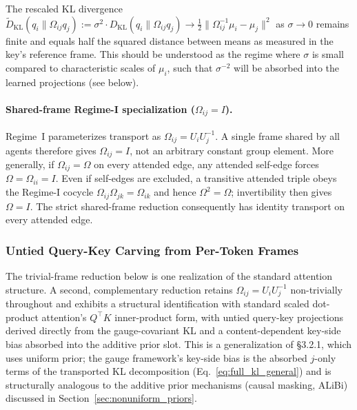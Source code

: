 \documentclass[twoside,11pt]{article}
\begin{document}
The rescaled KL divergence $\widetilde{D}_{\mathrm{KL}}(q_i \| \Omega_{ij}q_j) := \sigma^2 \cdot D_{\mathrm{KL}}(q_i \| \Omega_{ij}q_j) \to \frac{1}{2}\|\Omega_{ij}^{-1}\mu_i - \mu_j\|^2$ as $\sigma \to 0$ remains finite and equals half the squared distance between means as measured in the key's reference frame. This should be understood as the regime where $\sigma$ is small compared to characteristic scales of $\mu_i$, such that $\sigma^{-2}$ will be absorbed into the learned projections (see below).


\paragraph{Shared-frame Regime-I specialization ($\Omega_{ij} = I$).}

Regime~I parameterizes transport as $\Omega_{ij} = U_iU_j^{-1}$. A single frame shared by all agents therefore gives $\Omega_{ij} = I$, not an arbitrary constant group element. More generally, if $\Omega_{ij} = \Omega$ on every attended edge, any attended self-edge forces $\Omega = \Omega_{ii} = I$. Even if self-edges are excluded, a transitive attended triple obeys the Regime-I cocycle $\Omega_{ij}\Omega_{jk} = \Omega_{ik}$ and hence $\Omega^2 = \Omega$; invertibility then gives $\Omega = I$. The strict shared-frame reduction consequently has identity transport on every attended edge.

\subsubsection{Untied Query-Key Carving from Per-Token Frames}
\label{sec:untied_qk}

The trivial-frame reduction below is one realization of the standard attention structure. A second, complementary reduction retains $\Omega_{ij} = U_iU_j^{-1}$ non-trivially throughout and exhibits a structural identification with standard scaled dot-product attention's $Q^\top K$ inner-product form, with untied query-key projections derived directly from the gauge-covariant KL and a content-dependent key-side bias absorbed into the additive prior slot. This is a generalization of \citet{vaswani2017attention} \S3.2.1, which uses uniform prior; the gauge framework's key-side bias is the absorbed $j$-only terms of the transported KL decomposition (Eq.~\ref{eq:full_kl_general}) and is structurally analogous to the additive prior mechanisms (causal masking, ALiBi) discussed in Section~\ref{sec:nonuniform_priors}.
\end{document}

